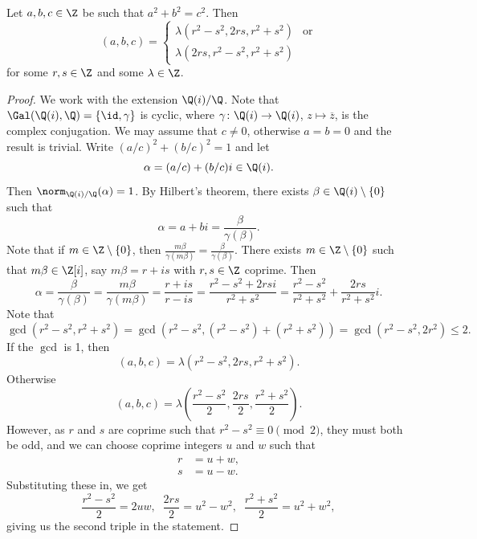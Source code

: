 

\begin{corollary}
    Let $a,b,c\in \Z$ be such that $a^2+b^2=c^2$. Then 
    \[
    (a,b,c)= \begin{cases} \lambda(r^2-s^2,2rs,r^2+s^2) & \text{or}\\ \lambda(2rs,r^2-s^2,r^2+s^2)\end{cases}
    \]
    for some $r,s\in\Z$ and some $\lambda\in\Z$.
\end{corollary}

\begin{proof}
    We work with the extension $\Q(i)/\Q$. Note that 
    $\Gal(\Q(i),\Q)=\{\id,\gamma\}$ is cyclic, where 
    $\gamma\colon\Q(i)\to\Q(i)$, $z\mapsto\overline{z}$, is the complex conjugation. 
    We may assume that $c\ne 0$, otherwise $a=b=0$ and the result is trivial.  
    Write $(a/c)^2+(b/c)^2=1$ and let 
    \[
    \alpha=(a/c)+(b/c)i\in\Q(i).
    \]
    Then
    $\norm_{\Q(i)/\Q}(\alpha)=1$. 
    By Hilbert's theorem, 
    there exists $\beta\in\Q(i)\setminus\{0\}$ such that 
    \[
    \alpha=a+bi=\frac{\beta}{\gamma(\beta)}.
    \]
    Note that if $m\in\Z\setminus\{0\}$, then 
    $\frac{m\beta}{\gamma(m\beta)}=\frac{\beta}{\gamma(\beta)}$. 
    There exists $m\in\Z\setminus\{0\}$ such that 
    $m\beta\in\Z[i]$, say $m\beta=r+is$ with $r,s\in\Z$ coprime. Then
    \[
    \alpha=\frac{\beta}{\gamma(\beta)}=\frac{m\beta}{\gamma(m\beta)}=
    \frac{r+is}{r-is}=\frac{r^2-s^2+2rsi}{r^2+s^2}=\frac{r^2-s^2}{r^2+s^2}+\frac{2rs}{r^2+s^2}i.
    \]
    Note that
    \[\gcd(r^2-s^2,r^2+s^2)=\gcd(r^2-s^2,(r^2-s^2)+(r^2+s^2))=\gcd(r^2-s^2,2r^2) \leq 2.\]
    If the $\gcd$ is 1, then
    \[(a,b,c)=\lambda(r^2-s^2,2rs,r^2+s^2).\]
    Otherwise
    \[(a,b,c)=\lambda\left(\frac{r^2-s^2}{2},\frac{2rs}{2},\frac{r^2+s^2}{2}\right).\]
    However, as $r$ and $s$ are coprime such that $r^2-s^2 \equiv 0 \pmod2$, they must both be odd, and we can choose coprime integers $u$ and $w$ such that
    \begin{align*}
    r &= u+w,\\
    s &= u-w.
\end{align*}
Substituting these in, we get
\[\frac{r^2-s^2}{2}=2uw, \;\; \frac{2rs}{2}=u^2-w^2, \;\; \frac{r^2+s^2}{2}=u^2+w^2,\]
giving us the second triple in the statement.
\end{proof}

